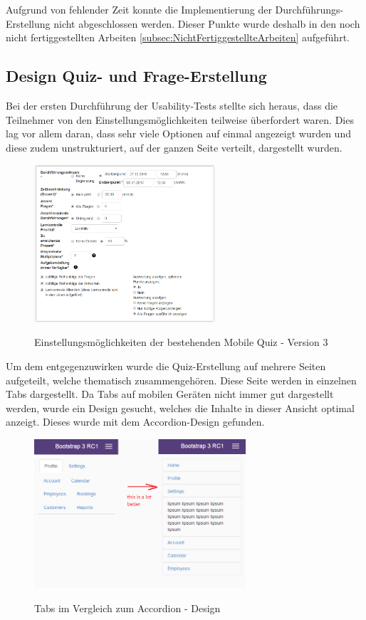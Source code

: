 \bigskip\bigskip

Aufgrund von fehlender Zeit konnte die Implementierung der Durchführungs-Erstellung nicht abgeschlossen werden. Dieser Punkte wurde deshalb in den noch nicht fertiggestellten Arbeiten \ref{subsec:NichtFertiggestellteArbeiten} aufgeführt.





\subsection{Design Quiz- und Frage-Erstellung}
Bei der ersten Durchführung der \gls{Usability-Test}s stellte sich heraus, dass die Teilnehmer von den Einstellungsmöglichkeiten teilweise überfordert waren. Dies lag vor allem daran, dass sehr viele Optionen auf einmal angezeigt wurden und diese zudem unstrukturiert, auf der ganzen Seite verteilt, dargestellt wurden.


\begin{figure}[H]
	\centering
	\includegraphics[width=0.6\textwidth]{Images/Einstellungen_alt.PNG}
	\caption{Einstellungsmöglichkeiten der bestehenden Mobile Quiz - Version 3}
	\cite{mobilequiz.ch}
\end{figure}


Um dem entgegenzuwirken wurde die Quiz-Erstellung auf mehrere Seiten aufgeteilt, welche thematisch zusammengehören. Diese Seite werden in einzelnen Tabs dargestellt. Da Tabs auf mobilen Geräten nicht immer gut dargestellt werden, wurde ein Design gesucht, welches die Inhalte in dieser Ansicht optimal anzeigt. Dieses wurde mit dem Accordion-Design gefunden.


\begin{figure}[H]
	\centering
	\includegraphics[width=0.7\textwidth]{Images/Bootstrap_Accordion.png}
	\caption{Tabs im Vergleich zum Accordion - Design}
	\cite{tabs_accodion}
\end{figure}

